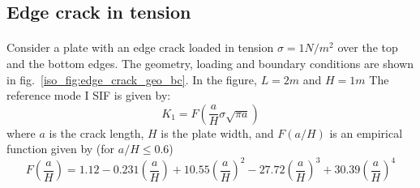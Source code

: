 \subsection{Edge crack in tension}

\paragraph{}
Consider a plate with an edge crack loaded in tension $\sigma=1N/m^2$ over the top and the bottom edges.
The geometry, loading and boundary conditions are shown in fig.~\ref{iso_fig:edge_crack_geo_bc}.
In the figure, $L=2m$ and $H=1m$
The reference mode I SIF is given by:
    \begin{equation}
        K_1 = F\left(
            \frac{a}{H}
            \sigma \sqrt{\pi a}
        \label{iso_eq:edge_crack_k1}
        \right)
    \end{equation}
where $a$ is the crack length, $H$ is the plate width, and $F(a/H)$ is an empirical function given by (for $a/H \leq 0.6$)
    \begin{equation}
        F\left( \frac{a}{H} \right) =
            1.12 - 0.231 \left( \frac{a}{H} \right) +
            10.55\left( \frac{a}{H} \right)^2 -
            27.72\left( \frac{a}{H} \right)^3 +
            30.39\left( \frac{a}{H} \right)^4
    \end{equation}

